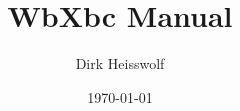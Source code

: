 \documentclass[a4paper,
               titlepage]{article}
\begin{document}
\newcommand{\secref}[2][Section]{\hyperref[{#2}]{\mbox{#1~\ref*{#2}} \mbox{``\nameref*{#2}``}}}
\newcommand{\tabref}[2][Table]{\hyperref[{#2}]{\mbox{#1~\ref*{#2}}}}
\newcommand{\figref}[2][Figure]{\hyperref[{#2}]{\mbox{#1~\ref*{#2}}}}

\title{WbXbc Manual}
\date{\today}
\author{Dirk Heisswolf}
\maketitle

\setcounter{tocdepth}{3}
\tableofcontents






















%



\end{document}
